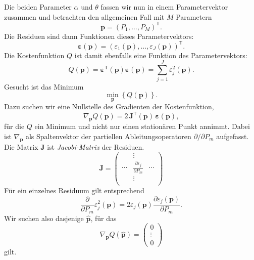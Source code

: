 Die beiden Parameter $\alpha$ und $\theta$ fassen wir nun in einem Parametervektor zusammen und
betrachten den allgemeinen Fall mit $M$ Parametern
\begin{equation}
\mathbf{p}
=
(P_1,\dots,P_M)^\mathsf{T}.
\end{equation}
Die Residuen sind dann Funktionen dieses Parametervektors:
\begin{equation}
\boldsymbol{\varepsilon}(\mathbf{p})
=
\left(
\varepsilon_1(\mathbf{p}),
\dots,
\varepsilon_J(\mathbf{p})
\right)^\mathsf{T}.
\end{equation}
Die Kostenfunktion $Q$ ist damit ebenfalls eine Funktion des Parametervektors:
\begin{equation}
Q(\mathbf{p})
=
\boldsymbol{\varepsilon}^\mathsf{T}(\mathbf{p})
\boldsymbol{\varepsilon}(\mathbf{p})
=
\sum_{j=1}^{J} \varepsilon_j^2(\mathbf{p}).
\label{Zielfunktional}
\end{equation}
Gesucht ist das Minimum
\begin{equation}
\min_{\mathbf{p}} \left\{ Q(\mathbf{p}) \right\}.
\end{equation}
Dazu suchen wir eine Nullstelle des Gradienten der Kostenfunktion,
\begin{equation}
\nabla_{\mathbf{p}} Q(\mathbf{p})
=
2\,\boldsymbol{J}^\mathsf{T}(\mathbf{p})\,
\boldsymbol{\varepsilon}(\mathbf{p}),
\label{ZielfunktionalGrad}
\end{equation}
für die $Q$ ein Minimum und nicht nur einen stationären Punkt annimmt. Dabei ist
$\nabla_{\mathbf{p}}$ als Spaltenvektor der partiellen Ableitungsoperatoren
$\partial/\partial P_m$ aufgefasst. Die Matrix $\boldsymbol{J}$ ist \textsl{Jacobi-Matrix}
der Residuen. 
\begin{equation}
\mathbf{J}
=
\begin{pmatrix}
 & \vdots & \\
\cdots & \frac{\partial \varepsilon_j}{\partial P_m} & \cdots\\
 & \vdots & \\
\end{pmatrix}
\label{eq:JacobimatrixResi}
\end{equation}
Für ein einzelnes Residuum gilt entsprechend
\begin{equation}
\frac{\partial}{\partial P_m}\varepsilon_j^2(\mathbf{p})
=
2\varepsilon_j(\mathbf{p})
\frac{\partial \varepsilon_j(\mathbf{p})}{\partial P_m}.
\end{equation}
Wir suchen also dasjenige $\hat{\mathbf{p}}$, für das
\begin{equation}
\nabla_{\mathbf{p}} Q(\hat{\mathbf{p}})
=
\left(\begin{array}{c}
0 \\
\vdots \\
0
\end{array}\right)
\label{ZielfunktionalGrad1}
\end{equation}
gilt.

